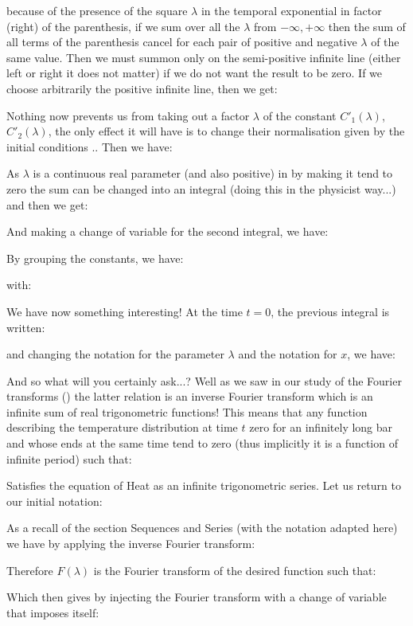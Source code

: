 	because of the presence of the square $\lambda$ in the temporal exponential in factor (right) of the parenthesis, if we sum over all the $\lambda$ from $-\infty,+\infty$ then the sum of all terms of the parenthesis cancel for each pair of positive and negative $\lambda$ of the same value. Then we must summon only on the semi-positive infinite line (either left or right it does not matter) if we do not want the result to be zero. If we choose arbitrarily the positive infinite line, then we get:
	
	Nothing now prevents us from taking out a factor $\lambda$ of the constant ${C'}_1(\lambda)$, ${C'}_2(\lambda)$, the only effect it will have is to change their normalisation given by the initial conditions .. Then we have:
	
	As $\lambda$ is a continuous real parameter (and also positive) in by making it tend to zero the sum can be changed into an integral (doing this in the physicist way...) and then we get:
	
	And making a change of variable for the second integral, we have:
	
	By grouping the constants, we have:	
	
	with:
	
	We have now something interesting! At the time $t=0$, the previous integral is written:
	
	and changing the notation for the parameter $\lambda$ and the notation for $x$, we have:
	
	And so what will you certainly ask...? Well as we saw in our study of the Fourier transforms () the latter relation is an inverse Fourier transform which is an infinite sum of real trigonometric functions! This means that any function describing the temperature distribution at time $t$ zero for an infinitely long bar and whose ends at the same time tend to zero (thus implicitly it is a function of infinite period) such that:
	
	Satisfies the equation of Heat as an infinite trigonometric series. Let us return to our initial notation:
	
	As a recall of the section Sequences and Series (with the notation adapted here) we have by applying the inverse Fourier transform:
	
	Therefore $F(\lambda)$ is the Fourier transform of the desired function such that:
	
	Which then gives by injecting the Fourier transform with a change of variable that imposes itself:
	
